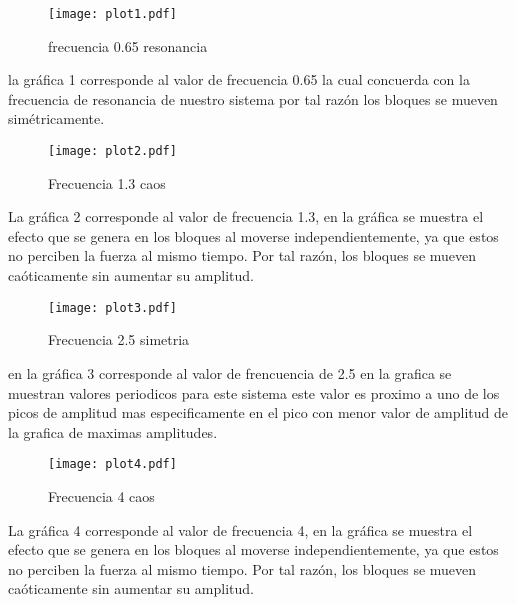 \documentclass[12pt]{article}
\begin{document}
\begin{figure}[h!]
\centering
\texttt{[image: plot1.pdf]}
\caption{frecuencia 0.65 resonancia }
\label{Fig.}
\end{figure}
la gráfica 1 corresponde al valor de frecuencia 0.65 la cual concuerda con la frecuencia de resonancia de nuestro sistema por tal razón los bloques se mueven simétricamente. 
\begin{figure}[h!]
\centering
\texttt{[image: plot2.pdf]}
\caption{Frecuencia 1.3 caos }
\label{Fig.}
\end{figure}

La gráfica 2 corresponde al valor de frecuencia 1.3, en la gráfica se muestra el efecto que se genera en los bloques al moverse independientemente, ya que estos no perciben la fuerza al mismo tiempo. Por tal razón, los bloques se mueven caóticamente sin aumentar su amplitud. 

\begin{figure}[h!]
\centering
\texttt{[image: plot3.pdf]}
\caption{Frecuencia 2.5 simetria  }
\label{Fig.}
\end{figure}

en la gráfica 3 corresponde al valor de frencuencia de 2.5 en la grafica se muestran valores periodicos para este sistema este valor es proximo a uno de los picos de amplitud mas especificamente en el pico con menor valor de amplitud de la grafica de maximas amplitudes.

\begin{figure}[h!]
\centering
\texttt{[image: plot4.pdf]}
\caption{Frecuencia 4 caos }
\label{Fig.}
\end{figure}
La gráfica 4 corresponde al valor de frecuencia 4, en la gráfica se muestra el efecto que se genera en los bloques al moverse independientemente, ya que estos no perciben la fuerza al mismo tiempo. Por tal razón, los bloques se mueven caóticamente sin aumentar su amplitud. 
\end{document}
